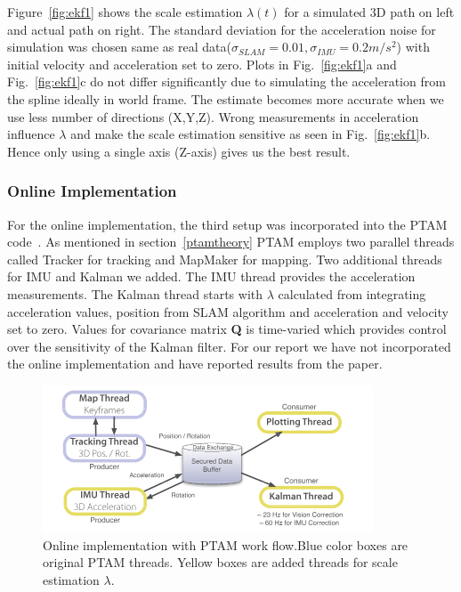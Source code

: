 Figure~\ref{fig:ekf1} shows the scale estimation $\lambda(t)$ for a simulated 3D path on left and actual path on right. The standard deviation for the acceleration noise for simulation was chosen same as real data($\sigma_{SLAM} = 0.01, \sigma_{IMU} = 0.2 m/s^2$) with initial velocity and acceleration set to zero. Plots in Fig.~\ref{fig:ekf1}a and Fig.~\ref{fig:ekf1}c do not differ significantly due to simulating the acceleration from the spline ideally in world frame. The estimate becomes more accurate when we use less number of directions (X,Y,Z).  Wrong measurements in acceleration influence $\lambda$ and make the scale estimation sensitive as seen in Fig.~\ref{fig:ekf1}b. Hence only using a single axis (Z-axis) gives us the best result. 


\subsubsection{Online Implementation}

For the online implementation, the third setup was incorporated into the PTAM code~\cite{ptamcode}. As mentioned in section~\ref{ptamtheory} PTAM employs two parallel threads called Tracker for tracking and MapMaker for mapping. Two additional threads for IMU and Kalman we added. The IMU thread provides the acceleration measurements. The Kalman thread starts with $\lambda$ calculated from integrating acceleration values, position from SLAM algorithm and acceleration and velocity set to zero. Values for covariance matrix \textbf{Q} is time-varied which provides control over the sensitivity of the Kalman filter. For our report we have not incorporated the online implementation and have reported results from the paper. 

\begin{figure}
  \includegraphics[width=\textwidth]{./figures/onlineEKF.png}
\caption{Online implementation with PTAM work flow.Blue color boxes are original PTAM threads. Yellow boxes are added threads for scale estimation $\lambda$.~\cite{nutzi2011fusion}}
\label{fig:ekf2}       %
\end{figure}
